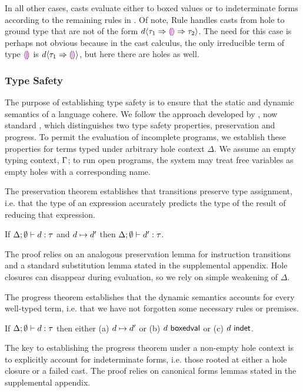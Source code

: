 In all other cases, casts evaluate either to boxed values or to
indeterminate forms according to the remaining rules
in .
%
Of note, Rule  handles casts from hole to
ground type that are not of
the form $d \langle{\tau_1}\Rightarrow{\textcolor{violet}{\llparenthesis}\textcolor{violet}{\rrparenthesis}}\Rightarrow{\tau_2}\rangle$.
%
The need for this case is perhaps not obvious because in the cast calculus,  the only irreducible term of type $\textcolor{violet}{\llparenthesis}\textcolor{violet}{\rrparenthesis}$
is $d \langle{\tau_1}\Rightarrow{\textcolor{violet}{\llparenthesis}\textcolor{violet}{\rrparenthesis}}\rangle$, but here there are holes as well.

\subsubsection{Type Safety}
%
The purpose of establishing type safety is to ensure that the static and dynamic semantics of a
language cohere.
%
We follow the approach developed by \citet{wright94:_type_soundness},
now standard \cite{pfpl}, which distinguishes two type safety
properties, preservation and progress.
%
To permit the evaluation of incomplete programs, we establish these
properties for terms typed under arbitrary hole context $\Delta$.
%
We assume an empty typing context, $\Gamma$; to run open programs, the
system may treat free variables as empty holes with a corresponding
name.

The preservation theorem establishes that transitions preserve type
assignment, i.e. that the type of an expression accurately predicts
the type of the result of reducing that expression.

\begin{thm}[Preservation]
  If $\Delta; \emptyset \vdash d : \tau$ and
  $d \mapsto d'$ then
  $\Delta; \emptyset \vdash d' : \tau$.
\end{thm}
\noindent
%
The proof relies on an analogous preservation lemma for instruction
transitions and a standard substitution lemma stated in
the supplemental appendix.
%
Hole closures can disappear during evaluation, so we rely on simple weakening
of $\Delta$.

The progress theorem establishes that the dynamic semantics accounts
for every well-typed term, i.e. that we have not forgotten some
necessary rules or premises.
%
\begin{thm}[Progress]
  If $\Delta; \emptyset \vdash d : \tau$ then either
  (a) $d \mapsto d'$ or
  (b) $d~\mathsf{boxedval}$ or
  (c) $d~\mathsf{indet}$.
\end{thm}
\noindent
The key to establishing the progress theorem under a non-empty hole
context is to explicitly account for indeterminate forms,
i.e. those rooted at either a hole closure or a failed cast.
%
The proof relies on canonical forms lemmas stated in the supplemental appendix.

